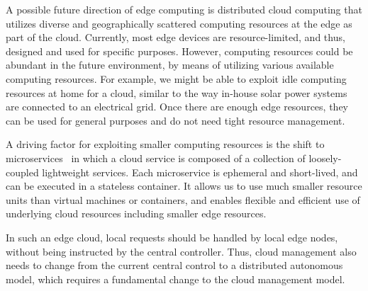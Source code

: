 
A possible future direction of edge computing is distributed cloud
computing that utilizes diverse and geographically scattered computing
resources at the edge as part of the cloud.
Currently, most edge devices are resource-limited, and thus, designed
and used for specific purposes.
However, computing resources could be abundant in the future environment,
by means of utilizing various available computing resources.
For example, we might be able to exploit idle computing resources at
home for a cloud, similar to the way in-house solar power systems are
connected to an electrical grid.
Once there are enough edge resources, they can be used for general
purposes and do not need tight resource management.

A driving factor for exploiting smaller computing resources
is the shift to microservices~\cite{nadareishvili2016microservice}
in which a cloud service is composed of a collection of loosely-coupled
lightweight services.
Each microservice is ephemeral and short-lived, and can be executed
in a stateless container.
It allows us to use much smaller resource units than virtual machines
or containers, and enables flexible and efficient use of underlying cloud
resources including smaller edge resources.

In such an edge cloud, local requests should be handled by local edge
nodes, without being instructed by the central controller.
Thus, cloud management also needs to change from the current central
control to a distributed autonomous model, which requires a
fundamental change to the cloud management model.



